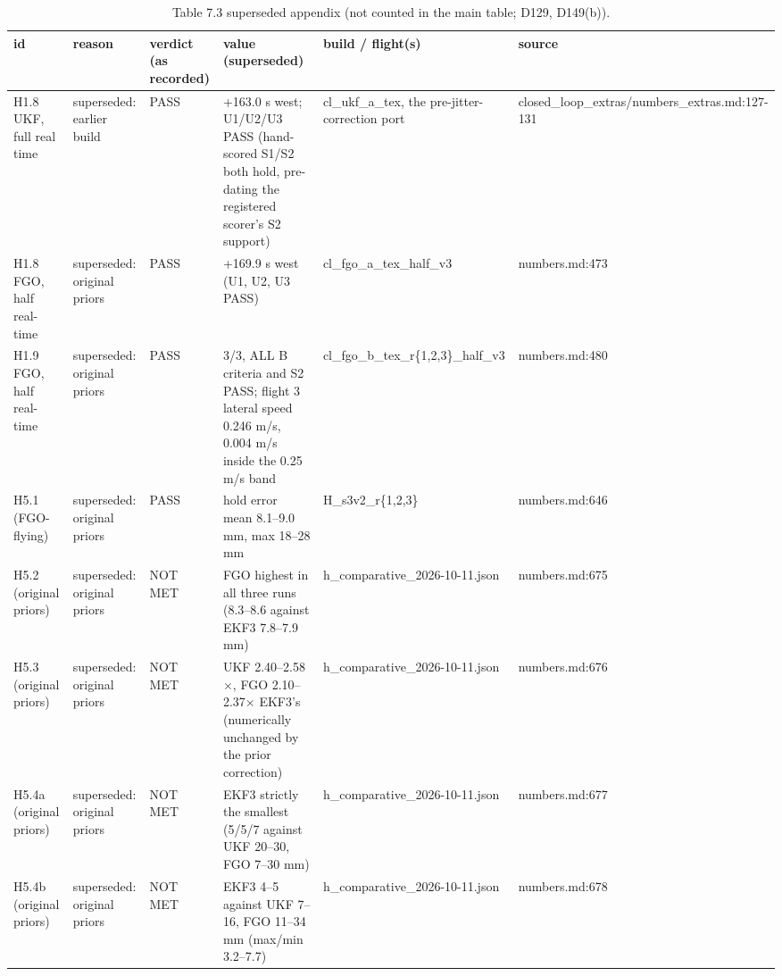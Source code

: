 \begin{table}[htbp]
\centering
\scriptsize
\caption{Table 7.3 superseded appendix (not counted in the main table; D129, D149(b)).}
\label{tab:R1_hypothesis_scorecard_superseded}
\begin{tabular}{p{}p{}p{}p{}p{}p{}}
\toprule
id & reason & verdict (as recorded) & value (superseded) & build / flight(s) & source \\
\midrule
H1.8 UKF, full real time & superseded: earlier build & PASS & +163.0 s west; U1/U2/U3 PASS (hand-scored S1/S2 both hold, pre-dating the registered scorer's S2 support) & cl\_ukf\_a\_tex, the pre-jitter-correction port & closed\_loop\_extras/numbers\_extras.md:127-131 \\
H1.8 FGO, half real-time & superseded: original priors & PASS & +169.9 s west (U1, U2, U3 PASS) & cl\_fgo\_a\_tex\_half\_v3 & numbers.md:473 \\
H1.9 FGO, half real-time & superseded: original priors & PASS & 3/3, ALL B criteria and S2 PASS; flight 3 lateral speed 0.246 m/s, 0.004 m/s inside the 0.25 m/s band & cl\_fgo\_b\_tex\_r\{1,2,3\}\_half\_v3 & numbers.md:480 \\
H5.1 (FGO-flying) & superseded: original priors & PASS & hold error mean 8.1--9.0 mm, max 18--28 mm & H\_s3v2\_r\{1,2,3\} & numbers.md:646 \\
H5.2 (original priors) & superseded: original priors & NOT MET & FGO highest in all three runs (8.3--8.6 against EKF3 7.8--7.9 mm) & h\_comparative\_2026-10-11.json & numbers.md:675 \\
H5.3 (original priors) & superseded: original priors & NOT MET & UKF 2.40--2.58$\times$, FGO 2.10--2.37$\times$ EKF3's (numerically unchanged by the prior correction) & h\_comparative\_2026-10-11.json & numbers.md:676 \\
H5.4a (original priors) & superseded: original priors & NOT MET & EKF3 strictly the smallest (5/5/7 against UKF 20--30, FGO 7--30 mm) & h\_comparative\_2026-10-11.json & numbers.md:677 \\
H5.4b (original priors) & superseded: original priors & NOT MET & EKF3 4--5 against UKF 7--16, FGO 11--34 mm (max/min 3.2--7.7) & h\_comparative\_2026-10-11.json & numbers.md:678 \\

\end{tabular}
\end{table}
